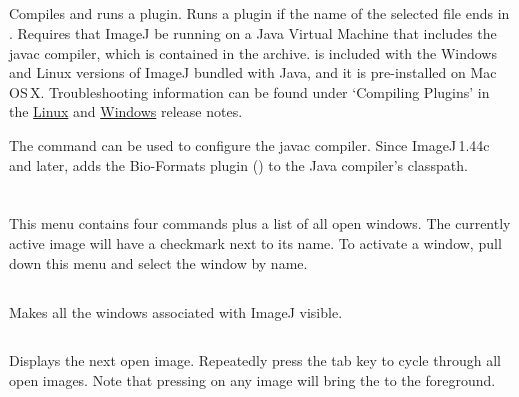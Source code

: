 \subsection{\protect{}\label{sub:Compile-and-Run...}}

Compiles and runs a plugin. Runs a plugin if the name
of the selected file ends in . Requires that
ImageJ be running on a Java Virtual Machine that includes the javac
compiler, which is contained in the  archive.
 is included with the Windows and Linux versions
of ImageJ bundled with Java, and it is pre-installed on Mac OS\,X.
Troubleshooting information can be found under `Compiling Plugins'
in the \href{http://imagej.nih.gov/ij/docs/install/linux.html\#compile}{Linux}
and \href{http://imagej.nih.gov/ij/docs/install/windows.html\#compile}{Windows}
release notes.

The 
command can be used to configure the javac compiler. Since ImageJ\,1.44c
and later,  adds
the Bio-Formats plugin () to the Java
compiler's classpath.

\clearpage{}


\section{\protect{}\label{sec:WindowMenu}}

This menu contains four commands plus a list of all open windows.
The currently active image will have a checkmark next to its name.
To activate a window, pull down this menu and select the window by
name.


\subsection{\protect\userinterface{Show All {[}~{]}~{]}}\label{sub:ShowAll}}

Makes all the windows associated with ImageJ visible.


\subsection{\protect{}\label{sub:PutBehind}}

Displays the next open image. Repeatedly press the tab key to cycle
through all open images. Note that pressing  on
any image will bring the  to the foreground.



